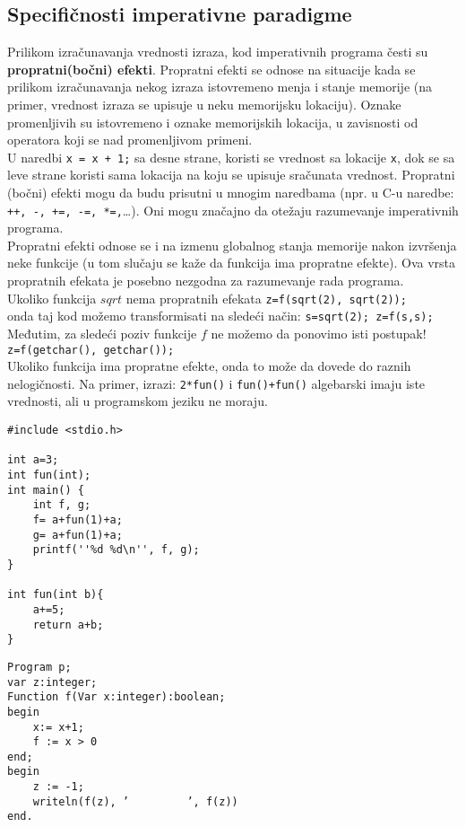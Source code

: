 \documentclass[../main.tex]{subfiles}
\begin{document}
\subsection{Specifičnosti imperativne paradigme}
Prilikom izračunavanja vrednosti izraza, kod imperativnih programa česti su {\bf propratni(bočni) efekti}. Propratni efekti se odnose na situacije kada se prilikom izračunavanja nekog izraza istovremeno menja i stanje memorije (na primer, vrednost izraza se upisuje u neku memorijsku lokaciju). Oznake promenljivih su istovremeno i oznake memorijskih lokacija, u zavisnosti od operatora koji se nad promenljivom primeni. 
\\
U naredbi \texttt{x = x + 1;} sa desne strane, koristi se vrednost sa lokacije \texttt{x}, dok se sa leve strane koristi sama lokacija na koju se upisuje sračunata vrednost. Propratni (bočni) efekti mogu da budu prisutni u mnogim naredbama (npr. u C-u naredbe: \texttt{++, -, +=, -=, *=,}\ldots). Oni mogu značajno da otežaju razumevanje imperativnih programa. 
\\
Propratni efekti odnose se i na izmenu globalnog stanja memorije nakon izvršenja neke funkcije (u tom slučaju se kaže da funkcija ima propratne efekte). Ova vrsta propratnih efekata je posebno nezgodna za razumevanje rada programa. 
\\
Ukoliko funkcija $sqrt$ nema propratnih efekata  \texttt{z=f(sqrt(2), sqrt(2));} \\
onda taj kod možemo transformisati na sledeći način: \texttt{s=sqrt(2); z=f(s,s);} \\
Međutim, za sledeći poziv funkcije $f$ ne možemo da ponovimo isti postupak! \texttt{z=f(getchar(), getchar());}
\\
Ukoliko funkcija ima propratne efekte, onda to može da dovede do raznih nelogičnosti. Na primer, izrazi: 
\texttt{2*fun()} i \texttt{fun()+fun()} algebarski imaju iste vrednosti, ali u programskom jeziku ne moraju.
\pagebreak
\begin{multicols}{2}
\begin{boxprimer}
\begin{Verbatim}
#include <stdio.h>

int a=3;
int fun(int);
int main() {
	int f, g;
	f= a+fun(1)+a;
	g= a+fun(1)+a;
	printf(''%d %d\n'', f, g);
}

int fun(int b){
	a+=5;
	return a+b;
}
\end{Verbatim}
\end{boxprimer}
\columnbreak
\begin{boxprimer}
\begin{Verbatim}
Program p;
var z:integer;
Function f(Var x:integer):boolean;
begin
	x:= x+1;
	f := x > 0
end;
begin
	z := -1;
	writeln(f(z), ’         ’, f(z))
end.
\end{Verbatim}
\end{boxprimer}
\end{multicols}
\end{document}
